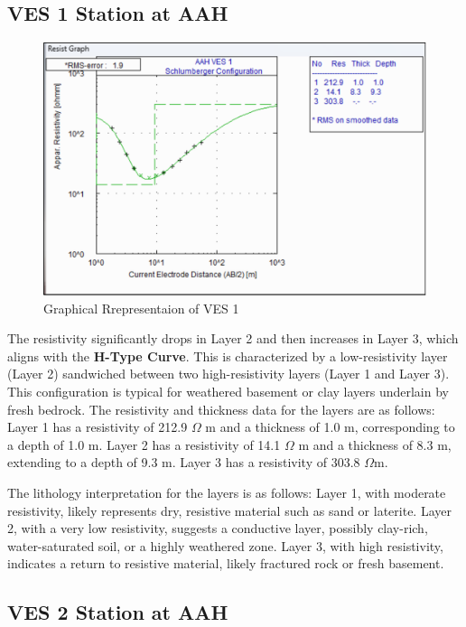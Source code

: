 \documentclass[12pt,a4paper]{report}
\begin{document}
\subsection{VES 1 Station at AAH}

\begin{figure}[H]
    \centering
    \includegraphics[width=1.0\textwidth]{aah_ves1.png}
    \caption{Graphical Rrepresentaion of VES 1}
    \label{fig:AAH_VES_1_Curve}
\end{figure}

The resistivity significantly drops in Layer 2 and then increases in Layer 3, which aligns with the \textbf{H-Type Curve}. This is characterized by a low-resistivity layer (Layer 2) sandwiched between two high-resistivity layers (Layer 1 and Layer 3). This configuration is typical for weathered basement or clay layers underlain by fresh bedrock. The resistivity and thickness data for the layers are as follows: Layer 1 has a resistivity of 212.9 $\Omega$ m and a thickness of 1.0 m, corresponding to a depth of 1.0 m. Layer 2 has a resistivity of 14.1 $\Omega$ m and a thickness of 8.3 m, extending to a depth of 9.3 m. Layer 3 has a resistivity of 303.8 $\Omega$m.

The lithology interpretation for the layers is as follows: Layer 1, with moderate resistivity, likely represents dry, resistive material such as sand or laterite. Layer 2, with a very low resistivity, suggests a conductive layer, possibly clay-rich, water-saturated soil, or a highly weathered zone. Layer 3, with high resistivity, indicates a return to resistive material, likely fractured rock or fresh basement.

\subsection{VES 2 Station at AAH}
\end{document}
